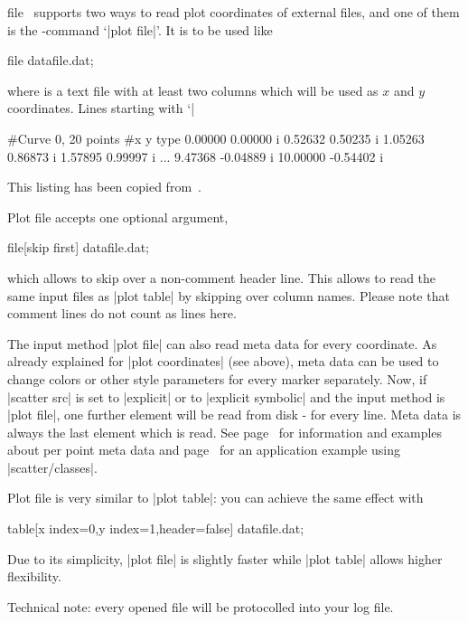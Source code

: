 \begin{addplotoperation}[]{file}{}
\label{pgfplots:addplot:file}
\PGFPlots\ supports two ways to read plot coordinates of external files, and one of them is the \Tikz-command `|plot file|'. It is to be used like
\begin{codeexample}
\addplot file {datafile.dat};
\end{codeexample}
where  is a text file with at least two columns which will be used as $x$ and $y$ coordinates. Lines starting with `|%
\begin{codeexample}
#Curve 0, 20 points
#x y type
0.00000 0.00000 i
0.52632 0.50235 i
1.05263 0.86873 i
1.57895 0.99997 i
...
9.47368 -0.04889 i
10.00000 -0.54402 i
\end{codeexample}
This listing has been copied from~\cite[section~16.4]{tikz}.

Plot file accepts one optional argument,

\begin{codeexample}
\addplot file[skip first] {datafile.dat};
\end{codeexample}

\noindent
which allows to skip over a non-comment header line. This allows to read the same input files as |plot table| by skipping over column names. Please note that comment lines do not count as lines here.

The input method |plot file| can also read meta data for every coordinate. As already explained for |plot coordinates| (see above), meta data can be used to change colors or other style parameters for every marker separately. Now, if |scatter src| is set to |explicit| or to |explicit symbolic| and the input method is |plot file|, one further element will be read from disk - for every line. Meta data is always the last element which is read. See page~\pageref{pgfplots:scatter:src} for information and examples about per point meta data and page~\pageref{pgfplots:scatterclasses} for an application example using |scatter/classes|.


Plot file is very similar to |plot table|: you can achieve the same effect with
\begin{codeexample}
\addplot table[x index=0,y index=1,header=false] {datafile.dat};
\end{codeexample}
\noindent Due to its simplicity, |plot file| is slightly faster while |plot table| allows higher flexibility.

Technical note: every opened file will be protocolled into your log file.
\end{addplotoperation}

